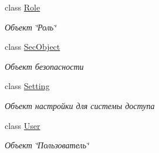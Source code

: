 \begin{DoxyCompactItemize}
class \hyperlink{class_security_1_1_model_1_1_role}{Role}
\begin{DoxyCompactList}\small\item\em Объект \char`\"{}Роль\char`\"{} \end{DoxyCompactList}\item 
class \hyperlink{class_security_1_1_model_1_1_sec_object}{Sec\+Object}
\begin{DoxyCompactList}\small\item\em Объект безопасности \end{DoxyCompactList}\item 
class \hyperlink{class_security_1_1_model_1_1_setting}{Setting}
\begin{DoxyCompactList}\small\item\em Объект настройки для системы доступа \end{DoxyCompactList}\item 
class \hyperlink{class_security_1_1_model_1_1_user}{User}
\begin{DoxyCompactList}\small\item\em Объект \char`\"{}Пользователь\char`\"{} \end{DoxyCompactList}\end{DoxyCompactItemize}
